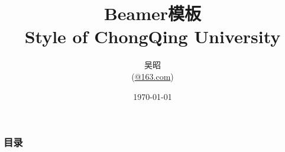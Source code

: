 \documentclass[UTF8]{beamer}
\title[重庆大学]{Beamer模板\\Style of ChongQing University}
\author[吴昭]{吴昭\\(\url{@163.com})}
\institute{重庆大学}
\date{\today}
\begin{document}

\renewcommand{\contentsname}{目录}     %
\renewcommand{\abstractname}{摘要}     %
\renewcommand{\refname}{参考文献}      %
\renewcommand{\indexname}{索引}
\renewcommand{\figurename}{图}
\renewcommand{\tablename}{表}
\renewcommand{\appendixname}{附录}
\begin{frame}[plain]
\maketitle
\end{frame}


\begin{frame}
\frametitle{目录}
\tableofcontents
\end{frame}






\end{document}
